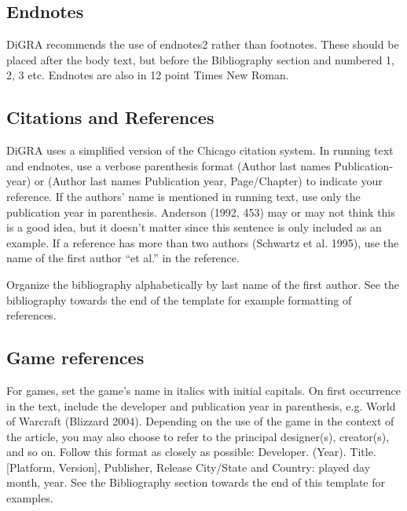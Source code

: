 \documentclass[11pt]{article}
\begin{document}
\subsection*{Endnotes}
DiGRA recommends the use of endnotes2 rather than footnotes. These should be placed
after the body text, but before the Bibliography section and numbered 1, 2, 3 etc.
Endnotes are also in 12 point Times New Roman.
\subsection*{Citations and References}
DiGRA uses a simplified version of the Chicago citation system. In running text and
endnotes, use a verbose parenthesis format (Author last names Publication-year) or
(Author last names Publication year, Page/Chapter) to indicate your reference. If the
authors’ name is mentioned in running text, use only the publication year in parenthesis.
Anderson (1992, 453) may or may not think this is a good idea, but it doesn’t matter since
this sentence is only included as an example. If a reference has more than two authors
(Schwartz et al. 1995), use the name of the first author “et al.” in the reference.

Organize the bibliography alphabetically by last name of the first author. See the
bibliography towards the end of the template for example formatting of references.
\subsection*{Game references}
For games, set the game’s name in italics with initial capitals. On first occurrence in the
text, include the developer and publication year in parenthesis, e.g. World of Warcraft
(Blizzard 2004). Depending on the use of the game in the context of the article, you may
also choose to refer to the principal designer(s), creator(s), and so on. Follow this format
as closely as possible:
Developer. (Year). Title. [Platform, Version], Publisher, Release City/State and Country:
played day month, year.
See the Bibliography section towards the end of this template for examples.
\end{document}
